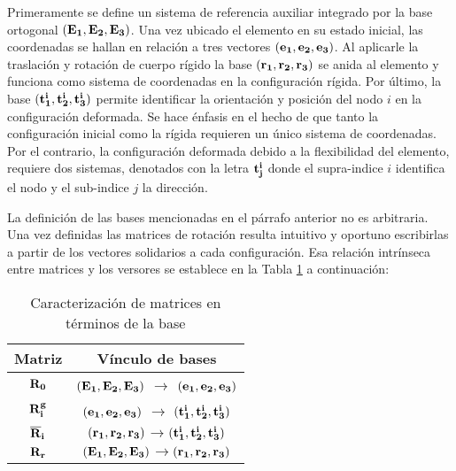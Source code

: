 Primeramente se define un sistema de referencia auxiliar integrado por la base ortogonal $(\bf{E_1},\bf{E_2},\bf{E_3})$. Una vez ubicado el elemento en su estado inicial, las coordenadas se hallan en relación a tres vectores $(\bf{e_1},\bf{e_2},\bf{e_3})$. Al aplicarle la traslación y rotación de cuerpo rígido la base $(\bf{r_1},\bf{r_2},\bf{r_3})$ se anida al elemento y funciona como sistema de coordenadas en la configuración rígida. Por último, la base $(\bf{t_1^i},\bf{t_2^i},\bf{t_3^i})$ permite identificar la orientación y posición del nodo $i$ en la configuración deformada. Se hace énfasis en el hecho de que tanto la configuración inicial como la rígida requieren un único sistema de coordenadas. Por el contrario, la configuración deformada debido a la flexibilidad del elemento, requiere dos sistemas, denotados con la letra $\bf{t}_j^i$ donde el supra-indice $i$ identifica el nodo y el sub-indice $j$ la dirección.


La definición de las bases mencionadas en el párrafo anterior no es arbitraria. Una vez definidas las matrices de rotación resulta intuitivo y oportuno escribirlas a partir de los vectores solidarios a cada configuración. Esa relación intrínseca entre matrices y los versores se establece en la Tabla \ref{Table:PRE:RelacionVM} a continuación: 

\begin{table}[htbp]
	\begin{center}
		\begin{tabular}{|c|c|}
			\hline
			Matriz & Vínculo de bases \\
			\hline \hline
			$\bf{R}_0$ &$(\bf{E_1},\bf{E_2},\bf{E_3})$ $\rightarrow$
			$(\bf{e_1},\bf{e_2},\bf{e_3})$   \\ \hline
			$\bf{R}_i^g$ & $(\bf{e_1},\bf{e_2},\bf{e_3})$ $\rightarrow$
			$(\bf{t_1^i},\bf{t_2^i},\bf{t_3^i})$ \\ \hline
			$\bf{\overline{R}}_i$ &
			$(\bf{r_1},\bf{r_2},\bf{r_3})$$\rightarrow$$(\bf{t_1^i},\bf{t_2^i},\bf{t_3^i})$
			\\ \hline
			$\bf{R}_r$ &
			$(\bf{E_1},\bf{E_2},\bf{E_3})$$\rightarrow$$(\bf{r_1},\bf{r_2},\bf{r_3})$ \\
			\hline
		\end{tabular}
		\caption{Caracterización de matrices en términos de la base}
		\label{Table:PRE:RelacionVM}
	\end{center}
\end{table}


